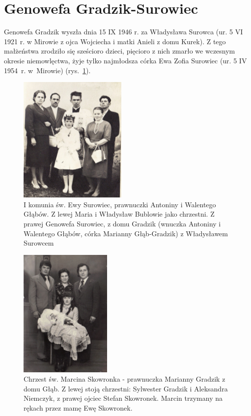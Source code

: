 \section{Genowefa Gradzik-Surowiec}
Genowefa Gradzik wyszła dnia 15 IX 1946 r. za Władysława Surowca (ur. 5 VI 1921 r. w Mirowie z ojca Wojciecha i matki Anieli z domu Kurek). Z tego małżeństwa zrodziło się sześcioro dzieci, pięcioro z nich zmarło we wczesnym okresie niemowlęctwa, żyje tylko najmłodsza córka Ewa Zofia Surowiec (ur. 5 IV 1954~r. w~Mirowie) (rys.~\ref{rys:ewa_skowronek_genowefa_i_wladyslaw_surowiec}).


\begin{figure}[!h]
\begin{center}
\includegraphics[width=0.47\textwidth]{zdjecia/ewa_skowronek_genowefa_i_wladyslaw_surowiec.jpg}
\caption[I komunia św. Ewy Surowiec]{I komunia św. Ewy Surowiec, prawnuczki Antoniny i Walentego Głąbów. Z lewej Maria i Władysław Bublowie jako chrzestni. Z prawej Genowefa Surowiec, z domu Gradzik (wnuczka Antoniny i Walentego Głąbów, córka Marianny Głąb-Gradzik) z Władysławem Surowcem}
\label{rys:ewa_skowronek_genowefa_i_wladyslaw_surowiec}
\end{center}
\end{figure}

\begin{figure}[!ht]
\begin{center}
\includegraphics[width=0.4\textwidth]{zdjecia/marcin_skowronek_chrzest.jpg}
\caption[Chrzest św. Marcina Skowronka]{Chrzest św. Marcina Skowronka - prawnuczka Marianny Gradzik z domu Głąb. Z lewej stoją chrzestni: Sylwester Gradzik i Aleksandra Niemczyk, z prawej ojciec Stefan Skowronek. Marcin trzymany na rękach przez mamę Ewę Skowronek.}
\label{rys:marcin_skowronek_chrzest}
\end{center}
\end{figure}

